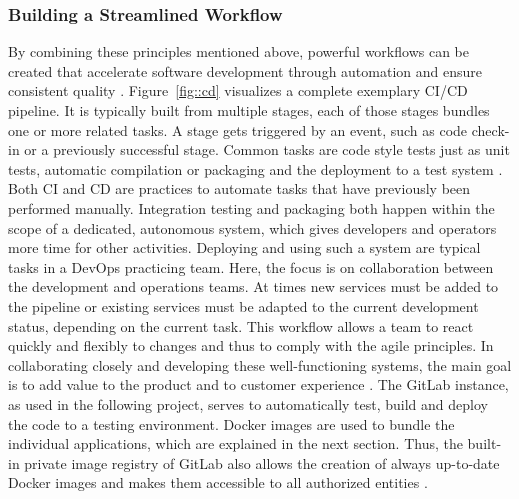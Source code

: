         \subsubsection{Building a Streamlined Workflow}
        By combining these principles mentioned above, powerful workflows can be created that accelerate software development through automation and ensure consistent quality \cite{base_devops}. Figure~\ref{fig::cd} visualizes a complete exemplary \ac{CI}/\ac{CD} pipeline. It is typically built from multiple stages, each of those stages bundles one or more related tasks. A stage gets triggered by an event, such as code check-in or a previously successful stage. Common tasks are code style tests just as unit tests, automatic compilation or packaging and the deployment to a test system \cite{azuredevops}.\newline
        Both \ac{CI} and \ac{CD} are practices to automate tasks that have previously been performed manually. Integration testing and packaging both happen within the scope of a dedicated, autonomous system, which gives developers and operators more time for other activities. Deploying and using such a system are typical tasks in a DevOps practicing team. Here, the focus is on collaboration between the development and operations teams. At times new services must be added to the pipeline or existing services must be adapted to the current development status, depending on the current task. This workflow allows a team to react quickly and flexibly to changes and thus to comply with the agile principles. In collaborating closely and developing these well-functioning systems, the main goal is to add value to the product and to customer experience \cite{azuredevops}.\newline
        The GitLab instance, as used in the following project, serves to automatically test, build and deploy the code to a testing environment. Docker images are used to bundle the individual applications, which are explained in the next section. Thus, the built-in private image registry of GitLab also allows the creation of always up-to-date Docker images and makes them accessible to all authorized entities \cite{gitlabdocs}.
        


